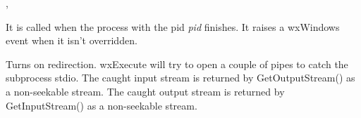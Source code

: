 ,\rtfsp
{}

\label{wxprocessonterminate}


It is called when the process with the pid {\it pid} finishes.
It raises a wxWindows event when it isn't overridden.



\label{wxprocessredirect}


Turns on redirection. wxExecute will try to open a couple of pipes
to catch the subprocess stdio. The caught input stream is returned by
GetOutputStream() as a non-seekable stream. The caught output stream is returned
by GetInputStream() as a non-seekable stream.

